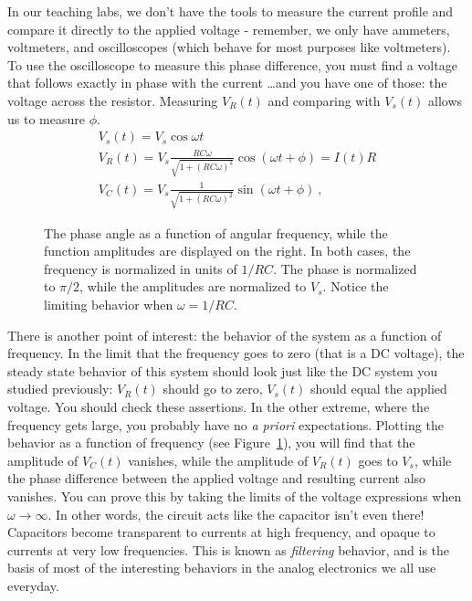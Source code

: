 \documentclass[12pt]{article}
\begin{document}
In our teaching labs, we don't have the tools to measure the current
profile and compare it directly to the applied voltage - remember, we
only have ammeters, voltmeters, and oscilloscopes (which behave for
most purposes like voltmeters).  To use the oscilloscope to measure
this phase difference, you must find a voltage that follows exactly in
phase with the current \ldots and you have one of those: the voltage
across the resistor.  Measuring $V_R(t)$ and comparing with $V_s(t)$
allows us to measure $\phi$.
\begin{gather*}
  V_s(t) = V_s \cos \omega t\\
  V_R(t) = V_s \frac{RC\omega}{\sqrt{1+(RC\omega)^2}} \cos( \omega t
  + \phi) = I(t) R\\
  V_C(t) = V_s \frac{1}{\sqrt{1+(RC\omega)^2}} \sin( \omega t + \phi)\ ,
\end{gather*}

\begin{figure}
  \centering
  \caption{The phase angle as a function of angular frequency, while
    the function amplitudes are displayed on the right.  In both
    cases, the frequency is normalized in units of $1/RC$.  The phase
    is normalized to $\pi/2$, while the amplitudes are normalized to
    $V_s$.  Notice the limiting behavior when $\omega = 1/RC$.}
  \label{fig:frequency}
\end{figure}
There is another point of interest: the behavior of the system as a
function of frequency.  In the limit that the frequency goes to zero
(that is a DC voltage), the steady state behavior of this system
should look just like the DC system you studied previously: $V_R(t)$
should go to zero, $V_s(t)$ should equal the applied voltage.  You
should check these assertions.  In the other extreme, where the
frequency gets large, you probably have no \textit{a priori}
expectations.  Plotting the behavior as a function of frequency (see
Figure~\ref{fig:frequency}), you will find that the amplitude of
$V_C(t)$ vanishes, while the amplitude of $V_R(t)$ goes to $V_s$,
while the phase difference between the applied voltage and resulting
current also vanishes.  You can prove this by taking the limits of the
voltage expressions when $\omega \to \infty$.  In other words, the
circuit acts like the capacitor isn't even there!  Capacitors become
transparent to currents at high frequency, and opaque to currents at
very low frequencies.  This is known as \textit{filtering} behavior,
and is the basis of most of the interesting behaviors in the analog
electronics we all use everyday.
\end{document}
